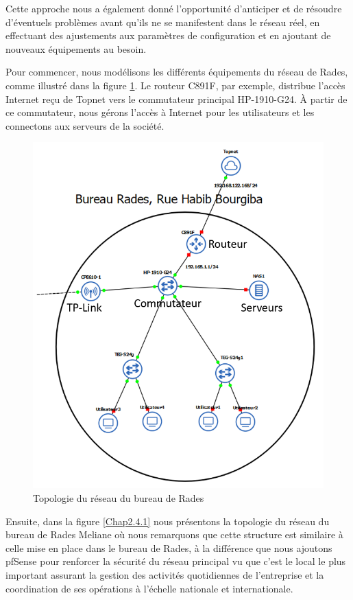 Cette approche nous a également donné l'opportunité d'anticiper et de résoudre d'éventuels problèmes avant qu'ils ne se manifestent dans le réseau réel, en effectuant des ajustements aux paramètres de configuration et en ajoutant de nouveaux équipements au besoin.

Pour commencer, nous modélisons les différents équipements du réseau de Rades, comme illustré dans la figure \ref{Chap2.2.0}. Le routeur C891F, par exemple, distribue l'accès Internet reçu de Topnet vers le commutateur principal HP-1910-G24. À partir de ce commutateur, nous gérons l'accès à Internet pour les utilisateurs et les connectons aux serveurs de la société.

\begin{figure}[H]
\centering
\includegraphics[width=16cm]{Images/BRades-Topologie.png}
\caption{Topologie du réseau du bureau de Rades}
\label{Chap2.2.0}
\end{figure}

Ensuite, dans la figure \ref{Chap2.4.1} nous présentons la topologie du réseau du bureau de Rades Meliane où nous remarquons que cette structure est similaire à celle mise en place dans le bureau de Rades, à la différence que nous ajoutons pfSense pour renforcer la sécurité du réseau principal vu que c'est le local le plus important assurant la gestion des activités quotidiennes de l'entreprise et la coordination de ses opérations à l'échelle nationale et internationale.

